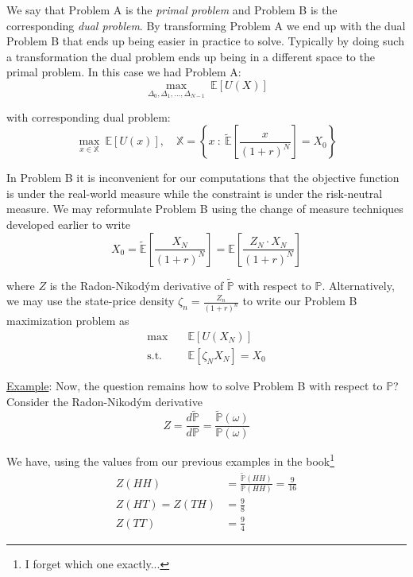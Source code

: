 \documentclass[12pt]{article}
\newlength\tindent
\renewcommand{\indent}{\hspace*{\tindent}}
\renewcommand{\P}{\mathbb P}
\newcommand{\E}{\mathbb E}
\begin{document}
\indent We say that Problem A is the {\em primal problem} and Problem B is the corresponding {\em dual problem}. By transforming Problem A we end up with the dual Problem B that ends up being easier in practice to solve. Typically by doing such a transformation the dual problem ends up being in a different space to the primal problem. In this case we had Problem A:
\begin{equation*}
	\max_{\Delta_0, \Delta_1, ..., \Delta_{N - 1}}~\E[U(X)]
\end{equation*}

with corresponding dual problem:
\begin{equation*}
	\max_{x \in \mathbb X}~\E[U(x)], \quad \mathbb X = \left\{x~:~ \tilde{\E}\left[ \frac{x}{(1 + r)^N} \right] = X_0 \right\}
\end{equation*}

\indent In Problem B it is inconvenient for our computations that the objective function is under the real-world measure while the constraint is under the risk-neutral measure. We may reformulate Problem B using the change of measure techniques developed earlier to write
\begin{equation*}
	X_0 = \tilde{\E} \left[ \frac{X_N}{(1 + r)^N} \right] = \E \left[ \frac{Z_N \cdot X_N}{(1 + r)^N} \right]
\end{equation*}

where $Z$ is the Radon-Nikod\'{y}m derivative of $\tilde{\P}$ with respect to $\P$. Alternatively, we may use the state-price density $\zeta_n = \frac{Z_n}{(1 + r)^n}$ to write our Problem B maximization problem as
\begin{align*}
	\max \quad &\E[U(X_N)] \\
	\text{s.t. } &\E[\zeta_N X_N] = X_0
\end{align*}

\underline{Example}: Now, the question remains how to solve Problem B with respect to $\P$? Consider the Radon-Nikod\'{y}m derivative 
\begin{equation*}
	Z = \frac{ d\tilde{\P} }{ d\P } = \frac{ \tilde{\P}(\omega) }{ \P(\omega) }
\end{equation*}

We have, using the values from our previous examples in the book\footnote{I forget which one exactly...}
\begin{align*}
	Z(HH) &= \frac{ \tilde{\P}(HH) }{ \P(HH) } = \frac{9}{16} \\
	Z(HT) = Z(TH) &= \frac{9}{8} \\
	Z(TT) &= \frac{9}{4}
\end{align*}
\end{document}
